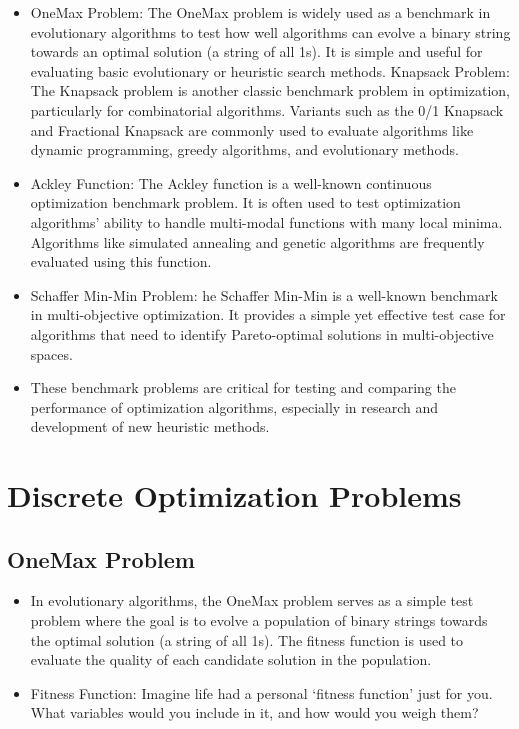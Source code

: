 \documentclass[
  letterpaper,
  DIV=11,
  numbers=noendperiod]{scrreprt}
\providecommand{\tightlist}{%
  \setlength{\itemsep}{0pt}\setlength{\parskip}{0pt}}\usepackage{longtable,booktabs,array}
\begin{document}
\begin{itemize}
\tightlist
\item
  OneMax Problem: The OneMax problem is widely used as a benchmark in
  evolutionary algorithms to test how well algorithms can evolve a
  binary string towards an optimal solution (a string of all 1s). It is
  simple and useful for evaluating basic evolutionary or heuristic
  search methods. Knapsack Problem: The Knapsack problem is another
  classic benchmark problem in optimization, particularly for
  combinatorial algorithms. Variants such as the 0/1 Knapsack and
  Fractional Knapsack are commonly used to evaluate algorithms like
  dynamic programming, greedy algorithms, and evolutionary methods.
\item
  Ackley Function: The Ackley function is a well-known continuous
  optimization benchmark problem. It is often used to test optimization
  algorithms' ability to handle multi-modal functions with many local
  minima. Algorithms like simulated annealing and genetic algorithms are
  frequently evaluated using this function.
\item
  Schaffer Min-Min Problem: he Schaffer Min-Min is a well-known
  benchmark in multi-objective optimization. It provides a simple yet
  effective test case for algorithms that need to identify
  Pareto-optimal solutions in multi-objective spaces.
\item
  These benchmark problems are critical for testing and comparing the
  performance of optimization algorithms, especially in research and
  development of new heuristic methods.
\end{itemize}


\chapter{Discrete Optimization
Problems}\label{discrete-optimization-problems}

\section{OneMax Problem}\label{onemax-problem}

\begin{itemize}
\item
  In evolutionary algorithms, the OneMax problem serves as a simple test
  problem where the goal is to evolve a population of binary strings
  towards the optimal solution (a string of all 1s). The fitness
  function is used to evaluate the quality of each candidate solution in
  the population.
\item
  Fitness Function: Imagine life had a personal `fitness function' just
  for you. What variables would you include in it, and how would you
  weigh them?
\end{itemize}
\end{document}
